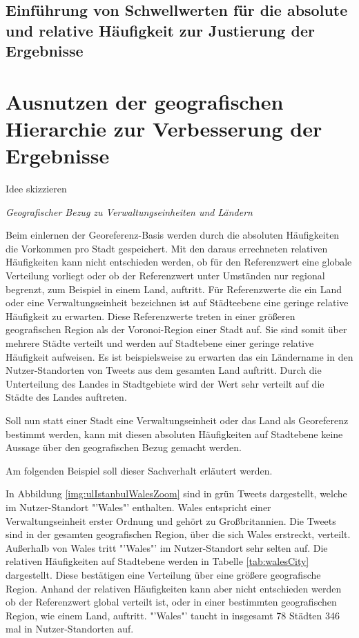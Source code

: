 		\subsection{Einführung von Schwellwerten für die absolute und relative Häufigkeit zur Justierung der Ergebnisse}  


	\section{Ausnutzen der geografischen Hierarchie zur Verbesserung der Ergebnisse} \label{sec:ausnutzenDerGeografischenHierarchie}

		Idee skizzieren

		\textit{Geografischer Bezug zu Verwaltungseinheiten und Ländern} 

			Beim einlernen der Georeferenz-Basis werden durch die absoluten Häufigkeiten die Vorkommen pro Stadt gespeichert.
			Mit den daraus errechneten relativen Häufigkeiten kann nicht entschieden werden, ob für den Referenzwert eine globale Verteilung vorliegt oder ob der Referenzwert unter Umständen nur regional begrenzt, zum Beispiel in einem Land, auftritt.
			Für Referenzwerte die ein Land oder eine Verwaltungseinheit bezeichnen ist auf Städteebene eine geringe relative Häufigkeit zu erwarten.
			Diese Referenzwerte treten in einer größeren geografischen Region als der Voronoi-Region einer Stadt auf.
			Sie sind somit über mehrere Städte verteilt und werden auf Stadtebene einer geringe relative Häufigkeit aufweisen.
			Es ist beispielsweise zu erwarten das ein Ländername in den Nutzer-Standorten von Tweets aus dem gesamten Land auftritt.
			Durch die Unterteilung des Landes in Stadtgebiete wird der Wert sehr verteilt auf die Städte des Landes auftreten.

			Soll nun statt einer Stadt eine Verwaltungseinheit oder das Land als Georeferenz bestimmt werden, kann mit diesen absoluten Häufigkeiten auf Stadtebene keine Aussage über den geografischen Bezug gemacht werden. 
			
			Am folgenden Beispiel soll dieser Sachverhalt erläutert werden.

			In Abbildung \ref{img:ulIstanbulWalesZoom} sind in grün Tweets dargestellt, welche im Nutzer-Standort "'Wales"' enthalten.
			Wales entspricht einer Verwaltungseinheit erster Ordnung und gehört zu Großbritannien.
			Die Tweets sind in der gesamten geografischen Region, über die sich Wales erstreckt, verteilt.
			Außerhalb von Wales tritt "'Wales"' im Nutzer-Standort sehr selten auf.
			Die relativen Häufigkeiten auf Stadtebene werden in Tabelle \ref{tab:walesCity} dargestellt.
			Diese bestätigen eine Verteilung über eine größere geografische Region.
			Anhand der relativen Häufigkeiten kann aber nicht entschieden werden ob der Referenzwert global verteilt ist, oder in einer bestimmten geografischen Region, wie einem Land, auftritt. 
			"'Wales"' taucht in insgesamt 78 Städten 346 mal in Nutzer-Standorten auf.

